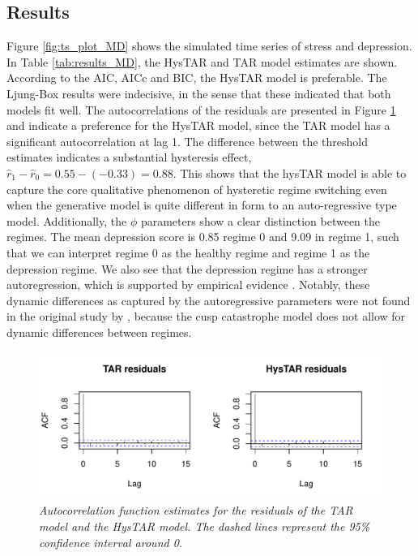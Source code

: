 \documentclass{article}
\begin{document}
\subsection{Results}
Figure \ref{fig:ts_plot_MD} shows the simulated time series of stress and depression.
In Table \ref{tab:results_MD}, the HysTAR and TAR model estimates are shown.
According to the AIC, AICc and BIC, the HysTAR model is preferable.
The Ljung-Box results were indecisive, in the sense that these indicated that both models fit well.
The autocorrelations of the residuals are presented in Figure \ref{fig:resplot_MD} and indicate a preference for the HysTAR model, since the TAR model has a significant autocorrelation at lag 1.
The difference between the threshold estimates indicates a substantial hysteresis effect, $\hat{r}_1 - \hat{r}_0 = 0.55 - (-0.33) = 0.88$.
This shows that the hysTAR model is able to capture the core qualitative phenomenon of hysteretic regime switching 
even when the generative model is quite different in form to an auto-regressive type model.
Additionally, the $\phi$ parameters show a clear distinction between the regimes. The mean depression score is 0.85 regime 0 and 9.09 in regime 1,
such that we can interpret regime 0 as the healthy regime and regime 1 as the depression regime. We also see that the depression regime has a stronger autoregression, which is supported by empirical evidence \citep{kuppens_emotional_2010, koval_getting_2012}.
Notably, these dynamic differences as captured by the autoregressive parameters were not found in the original study by \citet{cramer_major_2016}, because the cusp catastrophe model does not allow for dynamic differences between regimes. 

\begin{figure} 
\begin{center}
\includegraphics[scale=.6]{acf_plot}
\caption{\textit{Autocorrelation function estimates for the residuals of the TAR model and the HysTAR model. The dashed lines represent the 95\% confidence interval around 0.}}
\label{fig:resplot_MD}
\end{center}
\end{figure}
\end{document}
